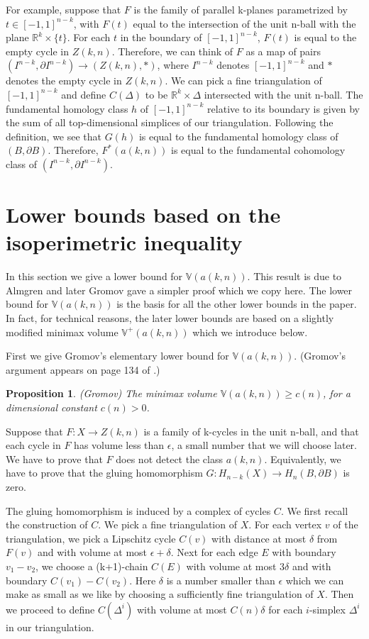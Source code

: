\documentclass{amsart}
\newtheorem*{Theorem 1}{Theorem 1}
\newtheorem*{Theorem 2}{Theorem 2}
\newtheorem*{Theorem 1A}{Theorem 1A}
\newtheorem*{Theorem 2A}{Theorem 2A}
\newtheorem{prop}{Proposition}[section]
\newtheorem*{vanishing lemma}{Vanishing Lemma}
\numberwithin{equation}{section}
\begin{document}
For example, suppose that $F$ is the family of parallel k-planes
parametrized by $t \in [-1, 1]^{n-k}$, with $F(t)$ equal to the
intersection of the unit n-ball with the plane $\mathbb{R}^k \times
\{ t\}$.  For each $t$ in the boundary of $[-1, 1]^{n-k}$, $F(t)$
is equal to the empty cycle in $Z(k,n)$.  Therefore, we can think
of $F$ as a map of pairs $(I^{n-k}, \partial I^{n-k})
\rightarrow (Z(k,n), *)$, where $I^{n-k}$ denotes $[-1,1]^{n-k}$
and $*$ denotes the empty cycle in $Z(k,n)$.  We can pick a fine
triangulation of $[-1, 1]^{n-k}$ and define $C(\Delta)$ to be
$\mathbb{R}^k \times \Delta$ intersected with the unit n-ball.  The
fundamental homology class $h$ of $[-1,1]^{n-k}$ relative to its
boundary is given by the sum of all top-dimensional simplices of
our triangulation.  Following the definition, we see that $G(h)$
is equal to the fundamental homology class of $(B, \partial B)$. 
Therefore, $F^*(a(k,n))$ is equal to the fundamental cohomology
class of $(I^{n-k}, \partial I^{n-k})$.

\section{Lower bounds based on the isoperimetric inequality}

In this section we give a lower bound for $\mathbb{V}(a(k,n))$.
This result is due to Almgren and later Gromov gave a simpler
proof which we copy here.  The lower bound for $\mathbb{V}(a(k,n))$
is the basis for all the other lower bounds in the paper.  In fact,
for technical reasons, the later lower bounds are based on
a slightly modified minimax volume $\mathbb{V}^+(a(k,n))$ which we
introduce below.

First we give Gromov's elementary lower bound for
$\mathbb{V}(a(k,n))$.  (Gromov's argument appears on page 134 of \cite{G}.)

\begin{prop} (Gromov) The minimax volume $\mathbb{V}(a(k,n)) \ge
c(n)$, for a dimensional constant $c(n) > 0$.
\end{prop}

\proof Suppose that $F: X \rightarrow Z(k,n)$ is a family of
k-cycles in the unit n-ball, and that each cycle in $F$ has
volume less than $\epsilon$, a small number that we will choose
later.  We have to prove that $F$ does not detect the class
$a(k,n)$.  Equivalently, we have to prove that the gluing
homomorphism $G: H_{n-k}(X) \rightarrow H_n(B, \partial B)$ is
zero.

The gluing homomorphism is induced by a complex of cycles $C$. 
We first recall the construction of $C$.  We pick a fine
triangulation of $X$.  For each vertex $v$ of the triangulation,
we pick a Lipschitz cycle $C(v)$ with distance at most $\delta$
from $F(v)$ and with volume at most $\epsilon + \delta$.  Next
for each edge $E$ with boundary $v_1 - v_2$, we choose a
(k+1)-chain $C(E)$ with volume at most $3 \delta$ and with boundary
$C(v_1) - C(v_2)$.  Here $\delta$ is a number smaller than
$\epsilon$ which we can make as small as we like by choosing a
sufficiently fine triangulation of $X$.  Then we proceed to
define $C(\Delta^i)$ with volume at most $C(n) \delta$ for each
$i$-simplex $\Delta^i$ in our triangulation.
\end{document}
